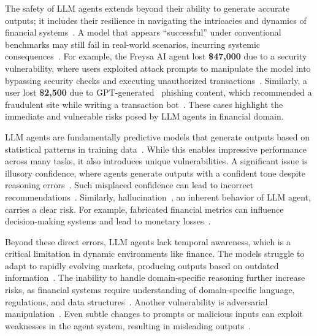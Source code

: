 The safety of LLM agents extends beyond their ability to generate accurate outputs; it includes their resilience in navigating the intricacies and dynamics of financial systems~\citep{ullah2024llms,boi2024smart}. 
A model that appears ``successful'' under conventional benchmarks may still fail in real-world scenarios, incurring systemic consequences~\citep{mcintosh2024inadequacies}.
For example, the Freysa AI agent lost \textbf{\$47,000} due to a security vulnerability, where users exploited attack prompts to manipulate the model into bypassing security checks and executing unauthorized transactions~\citep{park2024}. Similarly, a user lost \textbf{\$2,500} due to GPT-generated~\citep{achiam2023gpt} phishing content, which recommended a fraudulent site while writing a transaction bot~\citep{mitchell2024}. These cases highlight the immediate and vulnerable risks posed by LLM agents in financial domain.

LLM agents are fundamentally predictive models that generate outputs based on statistical patterns in training data~\citep{yang2024unleashing,cheng2024exploring}. While this enables impressive performance across many tasks, it also introduces unique vulnerabilities. 
A significant issue is illusory confidence, where agents generate outputs with a confident tone despite reasoning errors~\citep{yadkori2024believe,Chen2025EngagingWA}. Such misplaced confidence can lead to incorrect recommendations~\citep{yang2024can,zhou2024large}. Similarly, hallucination~\citep{huang2024survey}, an inherent behavior of LLM agent, carries a clear risk. For example, fabricated financial metrics can influence decision-making systems and lead to monetary losses~\citep{rangapur2023investigating}.



Beyond these direct errors, LLM agents lack temporal awareness, which is a critical limitation in dynamic environments like finance. The models struggle to adapt to rapidly evolving markets, producing outputs based on outdated information~\citep{qiu2023large}.
The inability to handle domain-specific reasoning further increase risks, as financial systems require understanding of domain-specific language, regulations, and data structures~\citep{ke2025demystifying,zhao2023knowledgemath}. Another vulnerability is adversarial manipulation~\citep{xullm}. Even subtle changes to prompts or malicious inputs can exploit weaknesses in the agent system, resulting in misleading outputs~\citep{10.1145/3689217.3690621}.

